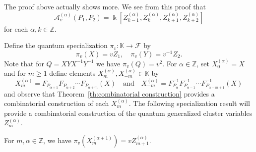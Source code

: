 \documentclass[ALCO,ThmDefs,Unicode,epreuves]{cedram}
\newcommand{\cA}{\mathcal{A}}
\newcommand{\cF}{\mathcal{F}}
\newcommand{\kk}{\Bbbk}
\newcommand{\KK}{\mathbb{K}}
\newcommand{\ZZ}{\mathbb{Z}}
\begin{document}
\begin{remark}
 The proof above actually shows more.
 We see from this proof that 
 \[\cA_v^{(\alpha)}(P_1,P_2)=\kk[Z^{(\alpha)}_{k-1},Z^{(\alpha)}_k,Z^{(\alpha)}_{k+1},Z^{(\alpha)}_{k+2}]\]
 for each $\alpha,k\in\ZZ$.
\end{remark}

Define the quantum specialization $\pi_v:\KK\to\cF$ by
\begin{equation}
 \label{eq:quantum specializations}
 \pi_v(X)=vZ_1,\quad\pi_v(Y)=v^{-1}Z_2.
\end{equation}
Note that for $Q=XYX^{-1}Y^{-1}$ we have $\pi_v(Q)=v^2$.
For $\alpha\in\ZZ$, set $X^{(\alpha)}_0=X$ and for $m\ge1$ define elements $X^{(\alpha)}_m,X^{(\alpha)}_{-m}\in\KK$ by
\[X^{(\alpha)}_m=F_{P_{\alpha+1}}F_{P_{\alpha+2}}\cdots F_{P_{\alpha+m}}(X)\quad\text{and}\quad X^{(\alpha)}_{-m}=F_{P_{\alpha}}^{-1}F_{P_{\alpha-1}}^{-1}\cdots F_{P_{\alpha-m+1}}^{-1}(X)\]
and observe that Theorem~\ref{th:combinatorial construction} provides a combinatorial construction of each $X^{(\alpha)}_m$.
The following specialization result will provide a combinatorial construction of the quantum generalized cluster variables $Z^{(\alpha)}_m$.
\begin{theorem}
 \label{th:quantum specialization}
 For $m,\alpha\in\ZZ$, we have $\pi_v(X^{(\alpha+1)}_m)=vZ^{(\alpha)}_{m+1}$.
\end{theorem}
\end{document}
